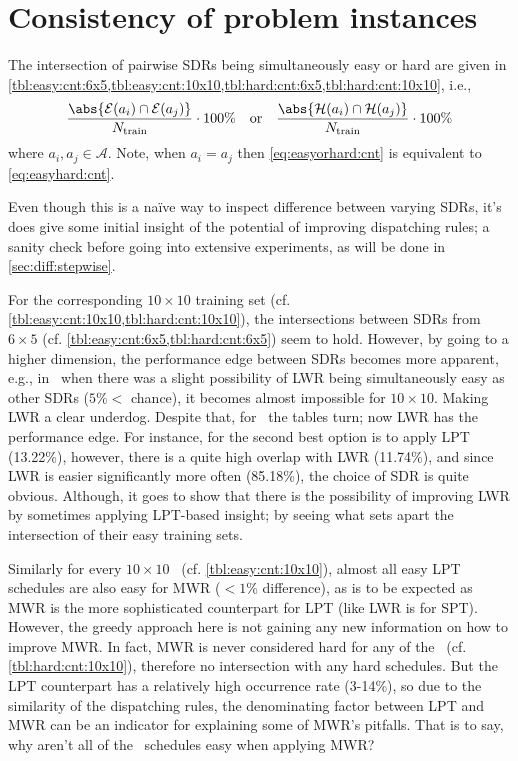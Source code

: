 \section{Consistency of problem instances}
The intersection of pairwise SDRs being simultaneously easy or hard are given in \cref{tbl:easy:cnt:6x5,tbl:easy:cnt:10x10,tbl:hard:cnt:6x5,tbl:hard:cnt:10x10}, i.e., 
\begin{equation}\label{eq:easyorhard:cnt}
	\frac{\abs{\mathcal{E}(a_i)\cap \mathcal{E}(a_j) }}{N_{\text{train}}} \cdot 100\%
	\quad \text{or} \quad 
	\frac{\abs{\mathcal{H}(a_i)\cap \mathcal{H}(a_j)}}{N_{\text{train}}}\cdot 100\%
\end{equation}
where $a_i,a_j\in\mathcal{A}$. Note, when $a_i=a_j$ then \cref{eq:easyorhard:cnt} is equivalent to \cref{eq:easyhard:cnt}.

Even though this is a na\"ive way to inspect difference between varying SDRs, it's does give some initial insight of the potential of improving dispatching rules; a sanity check before going into extensive experiments, as will be done in \cref{sec:diff:stepwise}.

For the corresponding $10\times10$ training set (cf. \cref{tbl:easy:cnt:10x10,tbl:hard:cnt:10x10}), the intersections between SDRs from $6\times5$ (cf. \cref{tbl:easy:cnt:6x5,tbl:hard:cnt:6x5}) seem to hold. 
However, by going to a higher dimension, the performance edge between SDRs becomes more apparent, e.g., in \JSP\ when there was a slight possibility of LWR being simultaneously easy as other SDRs ($5\%<$ chance), it becomes almost impossible for $10\times10$. 
Making LWR a clear underdog. 
Despite that, for \FSP\ the tables turn; now LWR has the performance edge. 
For instance, for  the second  best option is to apply LPT 
(13.22\%), however, there is a quite high overlap with LWR (11.74\%), and since 
LWR is easier significantly more often (85.18\%), the choice of SDR is quite 
obvious. 
Although, it goes to show that there is the possibility of improving LWR by sometimes applying LPT-based insight; by seeing what sets apart the intersection of their easy training sets. 

Similarly for every $10\times10$ \JSP\ (cf. \cref{tbl:easy:cnt:10x10}), almost all easy LPT schedules are also easy  for MWR ($<1\%$ difference), as is to be expected as MWR is the more sophisticated counterpart for LPT (like LWR is for SPT). 
However, the greedy approach here is  not gaining any new information on how to improve MWR. 
In fact, MWR is never considered hard for any of the \JSP\ (cf. \cref{tbl:hard:cnt:10x10}), therefore no intersection with any hard schedules. 
But the LPT counterpart has a relatively high occurrence rate (3-14\%), so due to the similarity of the dispatching rules, the denominating factor between LPT and MWR can be an indicator for explaining some of MWR's pitfalls.
That is to say, why aren't all of the \jsp\ schedules easy when applying MWR? 

